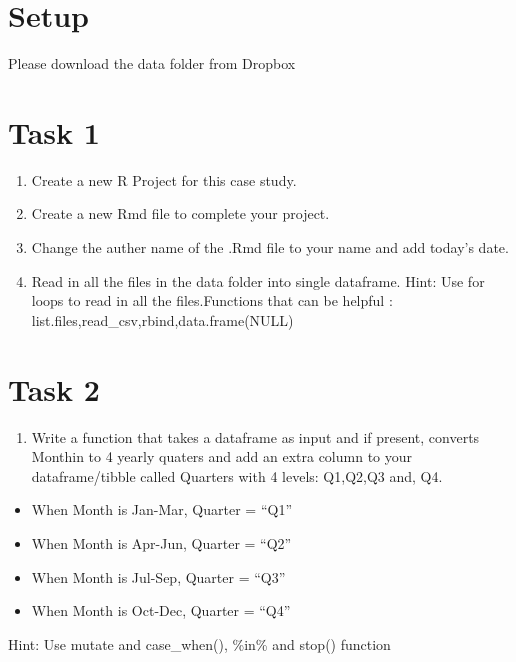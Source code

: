 \documentclass[
]{book}
\providecommand{\tightlist}{%
  \setlength{\itemsep}{0pt}\setlength{\parskip}{0pt}}
\begin{document}
\hypertarget{setup-1}{%
\section{Setup}\label{setup-1}}

Please download the data folder from Dropbox

\hypertarget{task-1}{%
\section{Task 1}\label{task-1}}

\begin{enumerate}
\def\labelenumi{\arabic{enumi}.}
\tightlist
\item
  Create a new R Project for this case study.
\item
  Create a new Rmd file to complete your project.
\item
  Change the auther name of the .Rmd file to your name and add today's date.
\item
  Read in all the files in the data folder into single dataframe. Hint: Use for loops to read in all the files.Functions that can be helpful : list.files,read\_csv,rbind,data.frame(NULL)
\end{enumerate}

\hypertarget{task-2}{%
\section{Task 2}\label{task-2}}

\begin{enumerate}
\def\labelenumi{\arabic{enumi}.}
\tightlist
\item
  Write a function that takes a dataframe as input and if present, converts Monthin to 4 yearly quaters and add an extra column to your dataframe/tibble called Quarters with 4 levels: Q1,Q2,Q3 and, Q4.
\end{enumerate}

\begin{itemize}
\tightlist
\item
  When Month is Jan-Mar, Quarter = ``Q1''
\item
  When Month is Apr-Jun, Quarter = ``Q2''
\item
  When Month is Jul-Sep, Quarter = ``Q3''
\item
  When Month is Oct-Dec, Quarter = ``Q4''
\end{itemize}

Hint: Use mutate and case\_when(), \%in\% and stop() function
\end{document}
